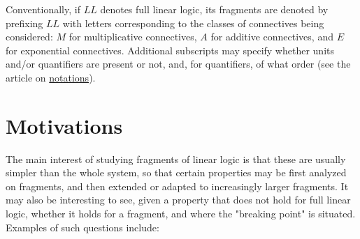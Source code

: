 Conventionally, if \(LL\) denotes full linear logic, its fragments are
denoted by prefixing \(LL\) with letters corresponding to the classes of
connectives being considered: \(M\) for multiplicative connectives,
\(A\) for additive connectives, and \(E\) for exponential connectives.
Additional subscripts may specify whether units and/or quantifiers are
present or not, and, for quantifiers, of what order (see the article on
\url{notations}).

\section{Motivations}\label{motivations}

The main interest of studying fragments of linear logic is that these
are usually simpler than the whole system, so that certain properties
may be first analyzed on fragments, and then extended or adapted to
increasingly larger fragments. It may also be interesting to see, given
a property that does not hold for full linear logic, whether it holds
for a fragment, and where the "breaking point" is situated. Examples of
such questions include:

